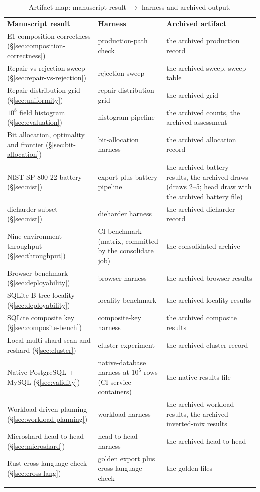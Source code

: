 \documentclass{svproc}
\begin{document}
\begin{table}[!ht]
\caption{Artifact map: manuscript result $\to$ harness and archived output.}
\label{tab:artifact-map}
\centering\footnotesize
\begin{tabular*}{\columnwidth}{@{\extracolsep{\fill}}lp{4.6cm}p{3.0cm}}
\hline\noalign{\smallskip}
\textbf{Manuscript result} & \textbf{Harness} & \textbf{Archived artifact} \\
\noalign{\smallskip}\hline\noalign{\smallskip}
E1 composition correctness (\S\ref{sec:composition-correctness}) & production-path check & the archived production record \\
Repair vs rejection sweep (\S\ref{sec:repair-vs-rejection}) & rejection sweep & the archived sweep, sweep table \\
Repair-distribution grid (\S\ref{sec:uniformity}) & repair-distribution grid & the archived grid \\
$10^8$ field histogram (\S\ref{sec:evaluation}) & histogram pipeline & the archived counts, the archived assessment \\
Bit allocation, optimality and frontier (\S\ref{sec:bit-allocation}) & bit-allocation harness & the archived allocation record \\
NIST SP 800-22 battery (\S\ref{sec:nist}) & export plus battery pipeline & the archived battery results, the archived draws (draws 2--5; head draw with the archived battery file) \\
dieharder subset (\S\ref{sec:nist}) & dieharder harness & the archived dieharder record \\
Nine-environment throughput (\S\ref{sec:throughput}) & CI benchmark (matrix, committed by the consolidate job) & the consolidated archive \\
Browser benchmark (\S\ref{sec:deployability}) & browser harness & the archived browser results \\
SQLite B-tree locality (\S\ref{sec:deployability}) & locality benchmark & the archived locality results \\
SQLite composite key (\S\ref{sec:composite-bench}) & composite-key harness & the archived composite results \\
Local multi-shard scan and reshard (\S\ref{sec:cluster}) & cluster experiment & the archived cluster record \\
Native PostgreSQL + MySQL (\S\ref{sec:validity}) & native-database harness at $10^5$ rows (CI service containers) & the native results file \\
Workload-driven planning (\S\ref{sec:workload-planning}) & workload harness & the archived workload results, the archived inverted-mix results \\
Microshard head-to-head (\S\ref{sec:microshard}) & head-to-head harness & the archived head-to-head \\
Rust cross-language check (\S\ref{sec:cross-lang}) & golden export plus cross-language check & the golden files \\
\noalign{\smallskip}\hline
\end{tabular*}
\end{table}
\end{document}
